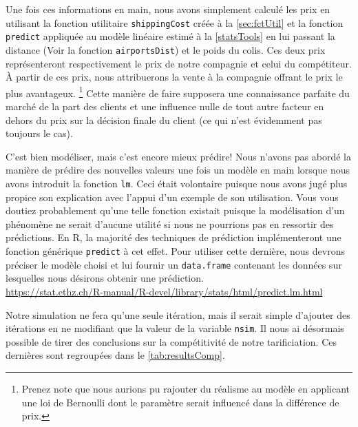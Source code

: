 Une fois ces informations en main, nous avons simplement calculé les prix en utilisant la fonction utilitaire \texttt{shippingCost} créée à la \autoref{sec:fctUtil} et la fonction \texttt{predict} appliquée au modèle linéaire estimé à la \autoref{statsTools} en lui passant la distance (Voir la fonction \texttt{airportsDist}) et le poids du colis. Ces deux prix représenteront respectivement le prix de notre compagnie et celui du compétiteur. À partir de ces prix, nous attribuerons la vente à la compagnie offrant le prix le plus avantageux. \footnote{Prenez note que nous aurions pu rajouter du réalisme au modèle en applicant une loi de Bernoulli dont le paramètre serait influencé dans la différence de prix.} Cette manière de faire supposera une connaissance parfaite du marché de la part des clients et une influence nulle de tout autre facteur en dehors du prix sur la décision finale du client (ce qui n'est évidemment pas toujours le cas). \\

\begin{moreInfo}{C'est bien modéliser, mais c'est encore mieux prédire!}
	Nous n'avons pas abordé la manière de prédire des nouvelles valeurs une fois un modèle en main lorsque nous avons introduit la fonction \texttt{lm}. Ceci était volontaire puisque nous avons jugé plus propice son explication avec l'appui d'un exemple de son utilisation. Vous vous doutiez probablement qu'une telle fonction existait puisque la modélisation d'un phénomène ne serait d'aucune utilité si nous ne pourrions pas en ressortir des prédictions. En R, la majorité des techniques de prédiction implémenteront une fonction générique \texttt{predict} à cet effet. Pour utiliser cette dernière, nous devrons préciser le modèle choisi et lui fournir un \texttt{data.frame} contenant les données sur lesquelles nous désirons obtenir une prédiction. \\
	\url{https://stat.ethz.ch/R-manual/R-devel/library/stats/html/predict.lm.html}
\end{moreInfo}

Notre simulation ne fera qu'une seule itération, mais il serait simple d'ajouter des itérations en ne modifiant que la valeur de la variable \texttt{nsim}. Il nous ai désormais possible de tirer des conclusions sur la compétitivité de notre tarificiation. Ces dernières sont regroupées dans le \autoref{tab:resultsComp}. \\

